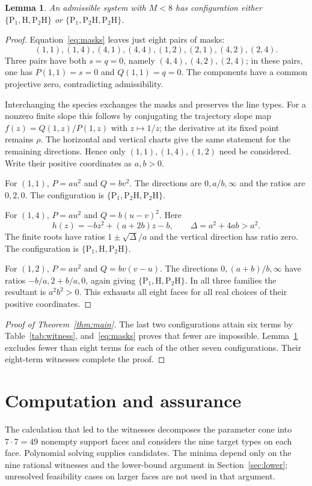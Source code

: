 \documentclass[11pt,a4paper]{article}
\newtheorem{lemma}[theorem]{Lemma}
\theoremstyle{definition}\newtheorem{definition}[theorem]{Definition}
\newcommand{\HH}{\mathrm H}
\newcommand{\PP}{\mathrm P}
\begin{document}
\begin{lemma}\label{lem:low}
An admissible system with $M<8$ has configuration either
$\{\PP_1,\HH,\PP_2\HH\}$ or
$\{\PP_1,\PP_2\HH,\PP_2\HH\}$.
\end{lemma}
\begin{proof}
Equation~\eqref{eq:masks} leaves just eight pairs of masks:
\[
 (1,1),(1,4),(4,1),(4,4),(1,2),(2,1),(4,2),(2,4).
\]
Three pairs have both $s=q=0$, namely $(4,4),(4,2),(2,4)$; in these pairs,
one has $P(1,1)=s=0$ and $Q(1,1)=q=0$. The components have a common
projective zero, contradicting admissibility.

Interchanging the species exchanges the masks and preserves the line types.
For a nonzero finite slope this follows by conjugating the trajectory slope
map $f(z)=Q(1,z)/P(1,z)$ with $z\mapsto1/z$; the derivative at its fixed
point remains $\rho$. The horizontal and vertical charts give the same
statement for the remaining directions. Hence only $(1,1),(1,4),(1,2)$
need be considered. Write their positive coordinates as $a,b>0$.

For $(1,1)$, $P=au^2$ and $Q=bv^2$. The directions are $0,a/b,\infty$
and the ratios are $0,2,0$. The configuration is
$\{\PP_1,\PP_2\HH,\PP_2\HH\}$.

For $(1,4)$, $P=au^2$ and $Q=b(u-v)^2$. Here
\[
 h(z)=-bz^2+(a+2b)z-b,\qquad \Delta=a^2+4ab>a^2.
\]
The finite roots have ratios $1\pm\sqrt\Delta/a$ and the vertical
direction has ratio zero. The configuration is
$\{\PP_1,\HH,\PP_2\HH\}$.

For $(1,2)$, $P=au^2$ and $Q=bv(v-u)$. The directions
$0,(a+b)/b,\infty$ have ratios $-b/a,2+b/a,0$, again giving
$\{\PP_1,\HH,\PP_2\HH\}$. In all three families the resultant is
$a^2b^2>0$. This exhausts all eight faces for all real choices of their
positive coordinates.
\end{proof}

\begin{proof}[Proof of Theorem~\ref{thm:main}]
The last two configurations attain six terms by Table~\ref{tab:witness},
and~\eqref{eq:masks} proves that fewer are impossible. Lemma~\ref{lem:low}
excludes fewer than eight terms for each of the other seven configurations.
Their eight-term witnesses complete the proof.
\end{proof}

\section{Computation and assurance}\label{sec:assurance}
The calculation that led to the witnesses decomposes the parameter cone into
$7\cdot7=49$ nonempty support faces and considers the nine target types on
each face. Polynomial solving supplies candidates. The minima depend only
on the nine rational witnesses and the lower-bound argument in
Section~\ref{sec:lower}; unresolved feasibility cases on larger faces are
not used in that argument.
\end{document}
